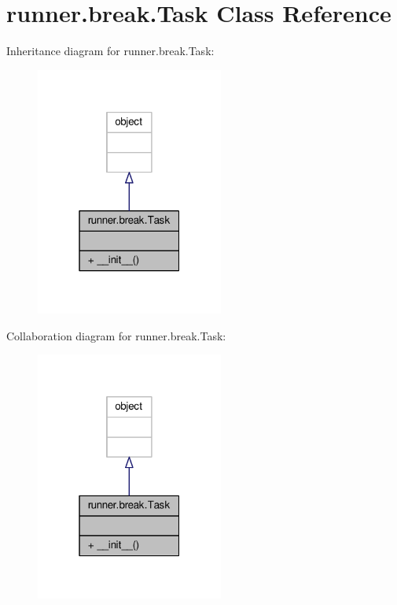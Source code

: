 \hypertarget{classrunner_1_1break_1_1Task}{}\section{runner.\+break.\+Task Class Reference}
\label{classrunner_1_1break_1_1Task}


Inheritance diagram for runner.\+break.\+Task\+:
\nopagebreak
\begin{figure}[H]
\begin{center}
\leavevmode
\includegraphics[width=175pt]{classrunner_1_1break_1_1Task__inherit__graph}
\end{center}
\end{figure}


Collaboration diagram for runner.\+break.\+Task\+:
\nopagebreak
\begin{figure}[H]
\begin{center}
\leavevmode
\includegraphics[width=175pt]{classrunner_1_1break_1_1Task__coll__graph}
\end{center}
\end{figure}
